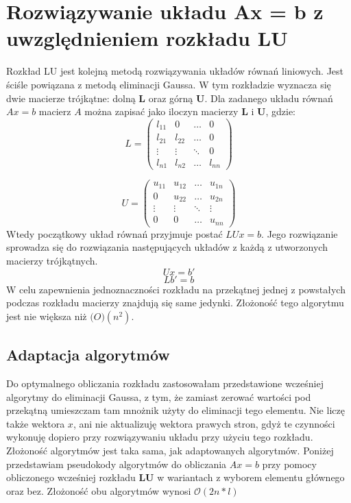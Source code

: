 \documentclass{article}
\begin{document}
\section{Rozwiązywanie układu Ax = b z uwzględnieniem rozkładu LU}
Rozkład LU jest kolejną metodą rozwiązywania układów równań 
liniowych. Jest ściśle powiązana z metodą eliminacji Gaussa. 
W tym rozkładzie wyznacza się dwie macierze trójkątne: dolną \textbf{L} 
oraz górną \textbf{U}.
\newline
\newline
Dla zadanego układu równań $Ax = b$ macierz $A$ można zapisać 
jako iloczyn macierzy \textbf{L} i \textbf{U}, gdzie:
$$
L = 
\begin{pmatrix}
    l_{11} & 0 & \ldots & 0 \\
    l_{21} & l_{22} & \ldots & 0 \\
    \vdots & \vdots & \ddots & 0 \\
    l_{n1} & l_{n2} & \ldots & l_{nn} 
\end{pmatrix}
$$

$$
U = 
\begin{pmatrix}
    u_{11} & u_{12} & \ldots & u_{1n} \\
    0 & u_{22} & \ldots & u_{2n} \\
    \vdots & \vdots & \ddots & \vdots \\
    0 & 0 & \ldots & u_{nn} 
\end{pmatrix}
$$
Wtedy początkowy układ równań przyjmuje postać $LUx = b.$ 
Jego rozwiązanie sprowadza się do rozwiązania następujących 
układów z każdą z utworzonych macierzy trójkątnych.
$$
Ux = b'
$$
$$
Lb' = b
$$
W celu zapewnienia jednoznaczności rozkładu na przekątnej 
jednej z powstałych podczas rozkładu macierzy znajdują się 
same jedynki.
\newline
\newline
Złożoność tego algorytmu jest nie większa niż $\mathcal(O)(n^2).$
\subsection{Adaptacja algorytmów}
Do optymalnego obliczania rozkładu zastosowałam przedstawione 
wcześniej algorytmy do eliminacji Gaussa, z tym, że zamiast zerować 
wartości pod przekątną umieszczam tam mnożnik użyty do 
eliminacji tego elementu. Nie liczę także wektora $x$, ani nie 
aktualizuję wektora prawych stron, gdyż te czynności wykonuję 
dopiero przy rozwiązywaniu układu przy użyciu tego rozkładu. 
Złożoność algorytmów jest taka sama, jak adaptowanych algorytmów. 
\newline
\newline
Poniżej przedstawiam pseudokody algorytmów do obliczania $Ax = b$ przy pomocy obliczonego 
wcześniej rozkładu \textbf{LU} w wariantach z wyborem elementu głównego 
oraz bez. Złożoność obu algorytmów wynosi $\mathcal{O}(2n*l)$
\end{document}
